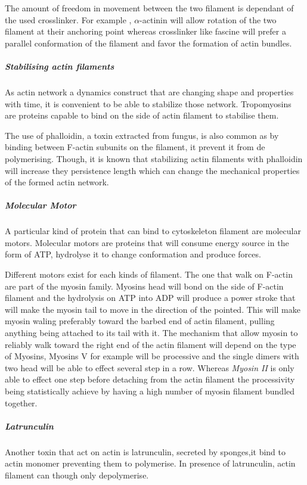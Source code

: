 \documentclass[A4paperpaper,11pt,english]{sphinxmanual}
\begin{document}
The amount of freedom in movement between the two filament is dependant of the
used crosslinker. For example , \(\alpha\)-actinin will allow rotation of the two
filament at their anchoring point whereas crosslinker like fascine will prefer
a parallel conformation of the filament and favor the formation of actin
bundles.


\subparagraph{Stabilising actin filaments}
\label{parts/part1:stabilising-actin-filaments}
As actin network a dynamics construct that are changing shape and properties
with time, it is convenient to be able to stabilize those network. Tropomyosins
are proteins capable to bind on the side of actin filament to stabilise them.

The use of phalloidin, a toxin extracted from fungus, is also common as by
binding between F-actin subunits on the filament, it prevent it from
de polymerising.  Though, it is known that stabilizing actin filaments with
phalloidin will increase they persistence length which can change the
mechanical properties of the formed actin network.


\subparagraph{Molecular Motor}
\label{parts/part1:molecular-motor}
A particular kind of protein that can bind to cytoskeleton filament are
molecular motors. Molecular motors are proteins that will consume energy source
in the form of ATP, hydrolyse it to change conformation and produce forces.

Different motors exist for each kinds of filament. The  one that walk on
F-actin are part of the myosin family. Myosins head will bond on the side of
F-actin filament and the hydrolysis on ATP into ADP will produce a power stroke
that will make the myosin tail to move in the direction of the pointed. This
will make myosin waling preferably toward the barbed end of actin filament,
pulling anything being attached to its tail with it. The mechanism that allow
myosin to reliably walk toward the right end of the actin filament will depend
on the type of Myosins,  Myosins V for example will be processive and the
single dimers with two head will be able to effect several step in a row.
Whereas \emph{Myosin II} is only able to effect one step before detaching from the
actin filament the processivity being statistically achieve by having  a high
number of myosin filament bundled together.


\subparagraph{Latrunculin}
\label{parts/part1:latrunculin}
Another toxin that act on actin is latrunculin, secreted by sponges,it bind to
actin monomer preventing them to polymerise.  In presence of latrunculin, actin
filament can though only depolymerise.
\end{document}
